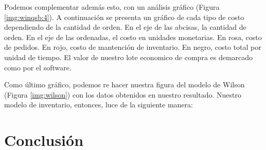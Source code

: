 Podemos complementar además esto, con un análisis gráfico (Figura \ref{img:winqsb:4}). A continuación se presenta un gráfico de cada tipo de costo dependiendo de la cantidad de orden. En el eje de las abcisas, la cantidad de orden. En el eje de las ordenadas, el costo en unidades monetarias. En rosa, costo de pedidos. En rojo, costo de mantención de inventario. En negro, costo total por unidad de tiempo. El valor de nuestro lote economico de compra es demarcado como  por el software.


Como último gráfico, podemos re hacer nuestra figura del modelo de Wilson (Figura \ref{img:wilson}) con los datos obtenidos en nuestro resultado. Nuestro modelo de inventario, entonces, luce de la siguiente manera:



\clearpage

\section{Conclusión}

\clearpage


